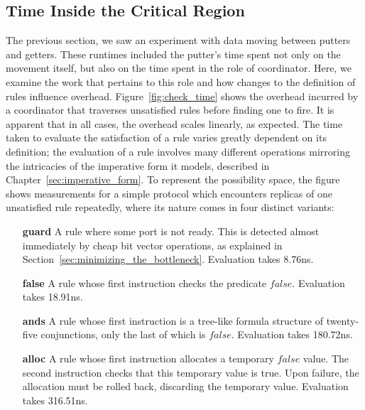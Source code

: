\subsection{Time Inside the Critical Region}
The previous section, we saw an experiment with data moving between putters and getters. These runtimes included the putter's time spent not only on the movement itself, but also on the time spent in the role of coordinator. Here, we examine the work that pertains to this role and how changes to the definition of rules influence overhead. Figure~\ref{fig:check_time} shows the overhead incurred by a coordinator that traverses unsatisfied rules before finding one to fire. It is apparent that in all cases, the overhead scales linearly, as expected. The time taken to evaluate the satisfaction of a rule varies greatly dependent on its definition; the evaluation of a rule involves many different operations mirroring the intricacies of the imperative form it models, described in Chapter~\ref{sec:imperative_form}. To represent the possibility space, the figure shows measurements for a simple protocol which encounters replicas of one unsatisfied rule repeatedly, where its nature comes in four distinct variants:
\begin{enumerate}
	\item [\textbf{guard}] A rule where some port is not ready. This is detected almost immediately by cheap bit vector operations, as explained in Section~\ref{sec:minimizing_the_bottleneck}. Evaluation takes 8.76ns.
	
	\item [\textbf{false}] A rule whose first instruction checks the predicate $false$. Evaluation takes 18.91ns.
	\item [\textbf{ands}] A rule whose first instruction is a tree-like formula structure of twenty-five conjunctions, only the last of which is $false$. Evaluation takes 180.72ns.
	\item [\textbf{alloc}] A rule whose first instruction allocates a temporary $false$ value. The second instruction checks that this temporary value is true. Upon failure, the allocation must be rolled back, discarding the temporary value. Evaluation takes 316.51ns.
\end{enumerate}


